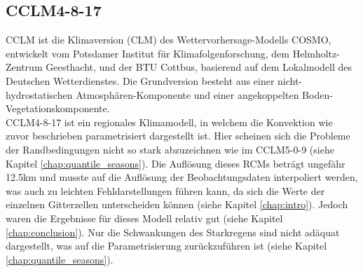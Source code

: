 \subsection{CCLM4-8-17}
CCLM ist die Klimaversion (CLM) des Wettervorhersage-Modells COSMO, entwickelt vom Potsdamer Institut für Klimafolgenforschung, dem Helmholtz-Zentrum Geesthacht, und der BTU Cottbus, basierend auf dem Lokalmodell des Deutschen Wetterdienstes. Die Grundversion besteht aus einer nicht-hydrostatischen Atmosphären-Komponente und einer angekoppelten Boden-Vegetationskomponente.\\
CCLM4-8-17 ist ein regionales Klimamodell, in welchem die Konvektion wie zuvor beschrieben parametrisiert dargestellt ist. Hier scheinen sich die Probleme der Randbedingungen nicht so stark abzuzeichnen wie im CCLM5-0-9 (siehe Kapitel \ref{chap:quantile_seasons}). Die Auflösung dieses RCMs beträgt ungefähr 12.5km und musste auf die Auflösung der Beobachtungsdaten interpoliert werden, was auch zu leichten Fehldarstellungen führen kann, da sich die Werte der einzelnen Gitterzellen unterscheiden können (siehe Kapitel \ref{chap:intro}). Jedoch waren die Ergebnisse für dieses Modell relativ gut (siehe Kapitel \ref{chap:conclusion}). Nur die Schwankungen des Starkregens sind nicht adäquat dargestellt, was auf die Parametrisierung zurückzuführen ist (siehe Kapitel \ref{chap:quantile_seasons}).
\newpage
